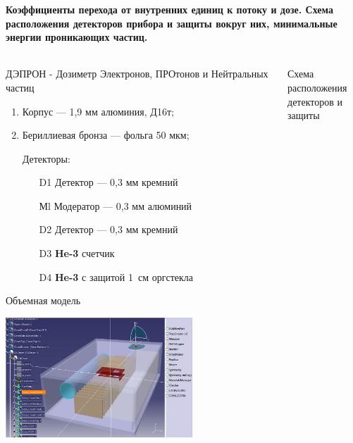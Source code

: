 \documentclass[t, aspectratio=43]{beamer}
\begin{document}
\begin{frame}
\frametitle{\insertsection} 
\framesubtitle{Коэффициенты перехода от внутренних единиц к потоку и
дозе. Схема расположения детекторов прибора и защиты вокруг них, минимальные энергии проникающих частиц.}
\begin{columns}[T]
	\begin{column}{.5\textwidth}
		\begin{block}{	 }		
		\tiny ДЭПРОН - Дозиметр Электронов, ПРОтонов и Нейтральных частиц 	
	 		\begin{enumerate}		
				\item Корпус --- 1,9 мм алюминия, Д16т;
				\item  Бериллиевая бронза --- фольга 50 мкм;
				\item[] Детекторы:				
				\begin{enumerate}
					\tiny
					\item[D1] Детектор 	--- 0,3 мм кремний
					\item[Мl] Модератор  	--- 0,3 мм алюминий
					\item[D2] Детектор 	--- 0,3 мм кремний
					\item[D3] \textbf{He-3} счетчик	
					\item[D4] \textbf{He-3} с защитой 1~см оргстекла
				\end{enumerate}
			\end{enumerate}
		
		\tiny Объемная модель
		
		\includegraphics[width=0.7\textwidth]{images/deproncatia2}
		
		\end{block}
	\end{column}
	\begin{column}{.5\textwidth}
		\begin{block}{}
			\tiny Схема расположения детекторов и защиты
		

\end{block}
\end{column}
\end{columns}
\end{frame}
\end{document}
